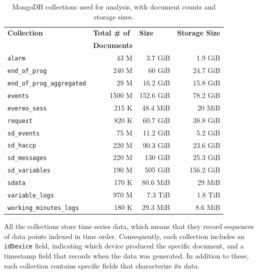 \begin{table}[h!]
    \centering
    \begin{tabular}{|l|r|r|r|}
    \hline
    \textbf{Collection} & \multicolumn{1}{l|}{\textbf{Total \# of}} & \multicolumn{1}{l|}{\textbf{Size}} & \multicolumn{1}{l|}{\textbf{Storage Size}} \\ 
                        & \multicolumn{1}{l|}{\textbf{Documents}}   &  &          \\ \hline
    \texttt{alarm}                & 43 M    & 3.7 GiB & 1.9 GiB \\ \hline
    \texttt{end\_of\_prog}        & 240 M   & 60 GiB & 24.7 GiB \\ \hline
    \texttt{end\_of\_prog\_aggregated} & 29 M    & 16.2 GiB & 15.8 GiB \\ \hline
    \texttt{events}               & 1500 M  & 152.6 GiB & 78.2 GiB \\ \hline
    \texttt{evereo\_sess}         & 215 K   & 48.4 MiB & 20 MiB \\ \hline
    \texttt{request}              & 820 K   & 60.7 GiB & 38.8 GiB \\ \hline
    \texttt{sd\_events}           & 75 M    & 11.2 GiB & 5.2 GiB \\ \hline
    \texttt{sd\_haccp}            & 220 M   & 90.3 GiB & 23.6 GiB \\ \hline
    \texttt{sd\_messages}         & 220 M   & 130 GiB & 25.3 GiB \\ \hline
    \texttt{sd\_variables}        & 190 M   & 505 GiB & 156.2 GiB \\ \hline
    \texttt{sdata}                & 170 K   & 80.6 MiB & 29 MiB \\ \hline
    \texttt{variable\_logs}       & 970 M   & 7.3 TiB & 1.8 TiB \\ \hline
    \texttt{working\_minutes\_logs} & 180 K  & 29.3 MiB & 8.6 MiB \\ \hline
    \end{tabular}
    \caption{MongoDB collections used for analysis, with document counts and storage sizes.}
    \label{tab:sizes}
\end{table}

All the collections store time series data, which means that they record sequences of data points indexed in time order. Consequently, each collection includes an \texttt{idDevice} field, indicating which device produced the specific document, and a timestamp field that records when the data was generated. In addition to these, each collection contains specific fields that characterize its data.

